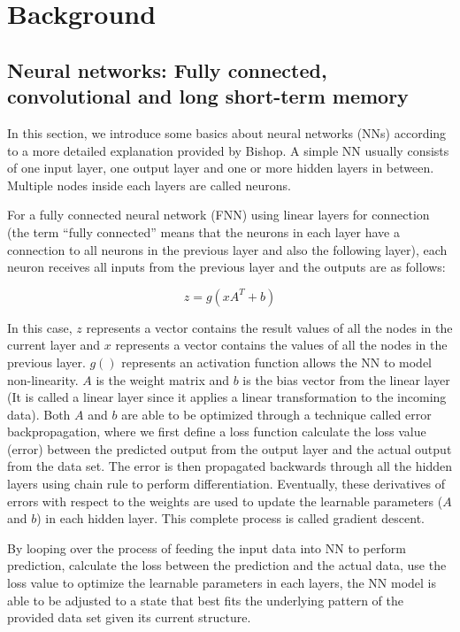 \chapter{Background}\label{chap:background}


\section{Neural networks: Fully connected, convolutional and long short-term memory}

In this section, we introduce some basics about neural networks (NNs) according to a more detailed explanation provided by Bishop. \citep{10.1117/1.2819119} A simple NN usually consists of one input layer, 
one output layer and one or more hidden layers in between. Multiple nodes inside each layers are called neurons. 

For a fully connected neural network (FNN) using linear layers for connection (the term “fully connected” means that the neurons in each layer have a connection to all neurons in the previous layer and also the following layer), each neuron receives all inputs from the previous layer and the outputs are as follows:

\begin{equation}
z = g(xA^{T} + b)
\end{equation}

In this case, $z$ represents a vector contains the result values of all the nodes in the current layer and $x$ represents a vector contains the values of all the nodes in the previous layer. $g()$ represents an activation function allows the NN to model non-linearity. $A$ is the weight matrix and $b$ is the bias vector from the linear layer (It is called a linear layer since it applies a linear transformation to the incoming data). Both $A$ and $b$ are able to be optimized through a technique called error backpropagation, where we first define a loss function calculate the loss value (error) between the predicted output from the output layer and the actual output from the data set. The error is then propagated backwards through all the hidden layers using chain rule to perform differentiation. Eventually, these derivatives of errors with respect to the weights are used to update the learnable parameters ($A$ and $b$) in each hidden layer. This complete process is called gradient descent. 

By looping over the process of feeding the input data into NN to perform prediction, calculate the loss between the prediction and the actual data, use the loss value to optimize the learnable parameters in each layers, the NN model is able to be adjusted to a state that best fits the underlying pattern of the provided data set given its current structure.

